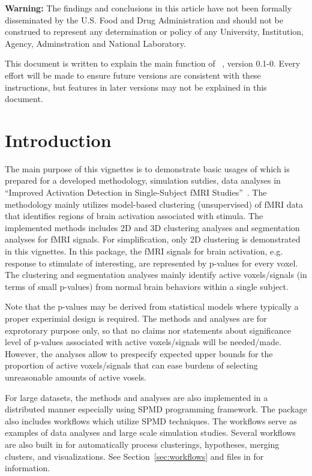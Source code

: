 
{\color{red} \bf Warning:}
The findings and conclusions in this article have not been
formally disseminated by the U.S. Food and Drug Administration
and should not be construed to represent any determination or
policy of any University, Institution, Agency, Adminstration
and National Laboratory.

This document is written to explain the main
function of ~\citep{Chen2018}, version 0.1-0.
Every effort will be made to ensure future versions are consistent with
these instructions, but features in later versions may not be explained
in this document.



\section[Introduction]{Introduction}
\label{sec:introduction}

The main purpose of this vignettes is to demonstrate basic usages of
 which is prepared for a developed methodology,
simulation sutdies, data analyses in
``Improved Activation Detection in Single-Subject fMRI
Studies''~\citep{ChenMaitra2018}.
The methodology mainly utilizes model-based clustering (unsupervised)
of fMRI data that identifies regions of brain activation associated
with stimula.
The implemented methods includes
2D and 3D clustering analyses and segmentation analyses for
fMRI signals.
For simplification,
only 2D clustering is demonstrated in this vignettes.
In this package, the fMRI signals for brain activation,
e.g. response to stimulate of interesting, are represented
by p-values for every voxel.
The clustering and segmentation analyses
mainly identify active voxels/signals (in terms of small p-values)
from normal brain behaviors within a single subject.

Note that the p-values may be derived from statistical models where typically
a proper experimial design is required.
The methods and analyses are for exprotorary purpose only, so that no claims
nor statements about significance level of p-values associated with
active voxels/signals will be needed/made. 
However, the analyses allow to prespecify expected upper bounds
for the proportion of active voxels/signals that can ease burdens
of selecting unreasonable amounts of active vosels.

For large datasets,
the methods and analyses are also implemented in a distributed manner
especially using SPMD programming framework.
The package also includes workflows which utilize SPMD techniques.
The workflows serve as examples of data analyses and
large scale simulation studies.
Several workflows are also built in for automatically
process clusterings, hypotheses, merging clusters, and visualizations.
See Section~\ref{sec:workflows} and files in 
for information.


